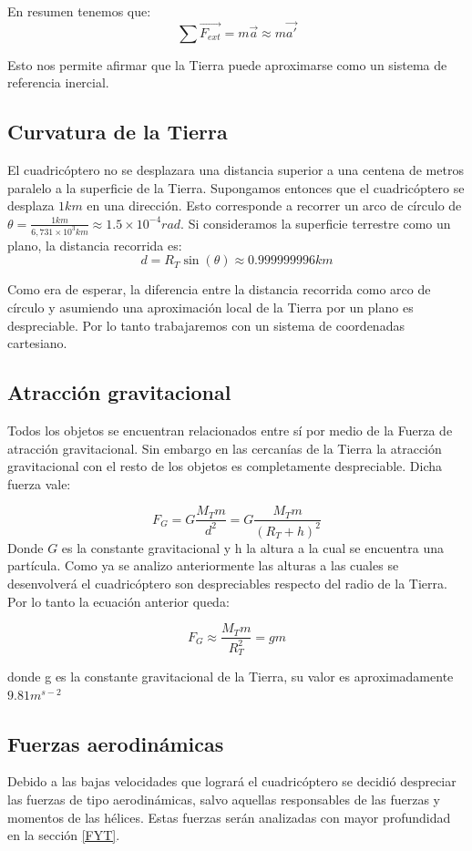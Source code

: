 \documentclass[main]{subfiles}
\begin{document}
En resumen tenemos que:
$$\sum \vec{F_{ext}}=m\vec{a}\approx m\vec{a\prime}$$

Esto nos permite afirmar que la Tierra puede aproximarse como un sistema de referencia inercial.


\subsection{Curvatura de la Tierra}
El cuadric\'optero no se desplazara una distancia superior a una centena de metros paralelo a la superficie de la Tierra. Supongamos entonces que el cuadric\'optero se desplaza $1km$ en una direcci\'on. Esto corresponde a recorrer un arco de c\'irculo de $\theta = \frac{1km}{6,731\times10^{3}km}\approx 1.5\times 10^{-4}rad$. Si consideramos la superficie terrestre como un plano, la distancia recorrida es: 
$$d=R_T\sin(\theta) \approx 0.999999996km$$

Como era de esperar, la diferencia entre la distancia recorrida como arco de c\'irculo y asumiendo una aproximaci\'on local de la Tierra por un plano es despreciable. Por lo tanto trabajaremos con un sistema de coordenadas cartesiano.
\subsection{Atracci\'on gravitacional}
Todos los objetos se encuentran relacionados entre s\'i por medio de la Fuerza de atracci\'on gravitacional. Sin embargo en las cercan\'ias de la Tierra la atracci\'on gravitacional con el resto de los objetos es completamente despreciable. Dicha fuerza vale:

$$
F_G=G\frac{M_Tm}{d^2}=G\frac{M_Tm}{(R_T+h)^2} 
$$ 
Donde $G$ es la constante gravitacional y h la altura a la cual se encuentra una part\'icula.  
Como ya se analizo anteriormente las alturas a las cuales se desenvolver\'a el cuadric\'optero son despreciables respecto del radio de la Tierra. Por lo tanto la ecuaci\'on anterior queda:

$$
F_G\approx\frac{M_Tm}{R_T^2}=gm
$$

donde g es la constante gravitacional de la Tierra, su valor es aproximadamente $9.81m^{s-2}$

\subsection{Fuerzas aerodin\'amicas}
Debido a las bajas velocidades que lograr\'a el cuadric\'optero se decidi\'o despreciar las fuerzas de tipo aerodin\'amicas, salvo aquellas responsables de las fuerzas y momentos de las h\'elices. Estas fuerzas ser\'an analizadas con mayor profundidad en la secci\'on \ref{FYT}.
\end{document}

